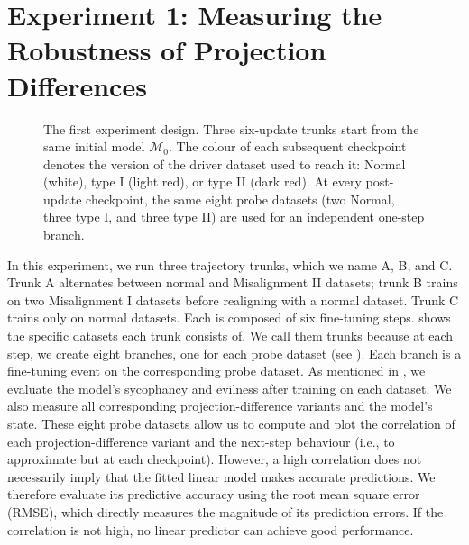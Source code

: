 \section{Experiment 1: Measuring the Robustness of Projection Differences}
\label{sec:robustness}
\begin{figure}[H]
    \centering
    
    \caption{The first experiment design. Three six-update trunks start from the same
    initial model $\mathcal{M}_0$. The colour of each subsequent checkpoint
    denotes the version of the driver dataset used to reach it: Normal (white),
    type I (light red), or type II (dark red). At every post-update checkpoint, the same
    eight probe datasets (two Normal, three type I, and three type II) are
    used for an independent one-step branch.}
    \label{fig:exp2-design}
\end{figure}

In this experiment, we run three trajectory trunks, which we name A, B, and C. Trunk A alternates between normal and Misalignment II datasets; trunk B trains on two Misalignment I datasets before realigning with a normal dataset. Trunk C trains only on normal datasets. Each is composed of six fine-tuning steps.  shows the specific datasets each trunk consists of. We call them trunks because at each step, we create eight branches, one for each probe dataset (see ). Each branch is a fine-tuning event on the corresponding probe dataset. As mentioned in , we evaluate the model's sycophancy and evilness after training on each dataset. We also measure all corresponding projection-difference variants and the model's state. These eight probe datasets allow us to compute and plot the correlation of each projection-difference variant and the next-step behaviour (i.e., to approximate  but at each checkpoint). However, a high correlation does not necessarily imply that the fitted linear model makes accurate predictions. We therefore evaluate its predictive accuracy using the root mean square error (RMSE), which directly measures the magnitude of its prediction errors. If the correlation is not high, no linear predictor can achieve good performance.

